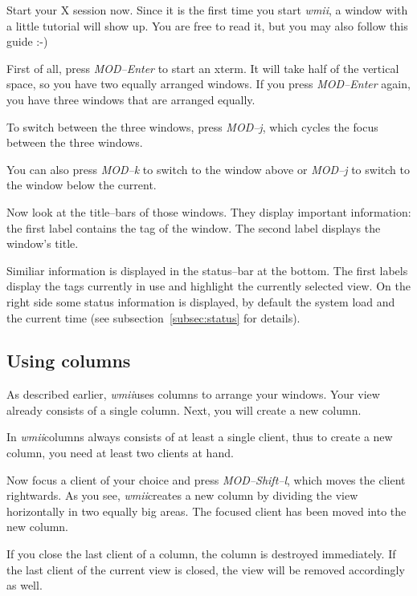 \documentclass[12pt,a4paper]{article} %
\newcommand{\wmii}{\emph{wmii}}
\begin{document}
    Start your X session now. Since it is the first time you
    start \wmii, a window with a little tutorial will show up. You are
    free to read it, but you may also follow this guide :-)

    First of all, press \emph{MOD--Enter} to start an xterm. It will
    take half of the vertical space, so you have two equally arranged
    windows. If you press \emph{MOD--Enter} again, you have three
    windows that are arranged equally.

    To switch between the three windows, press
    \emph{MOD--j}, which cycles the focus between the three windows.

    You can also press \emph{MOD--k} to switch to the window above or
    \emph{MOD--j} to switch to the window below the current.

    Now look at the title--bars of those windows. They display 
    important information: the first label contains the tag of
    the window. The second label displays the window's title.

    Similiar information is displayed in the status--bar at the bottom.  The
    first labels display the tags currently in use and highlight the currently
    selected view. On the right side some status information is displayed, by
    default the system load and the current time (see
    subsection~\ref{subsec:status} for details).

    \subsection{Using columns}

    As described earlier, \wmii uses columns to arrange your windows.
    Your view already consists of a single column.
    Next, you will create a new column.

    In \wmii columns always consists of at least a single client,
    thus to create a new column, you need at least two clients at hand.

    Now focus a client of your choice and press \emph{MOD--Shift--l},
    which moves the client rightwards. As you see, \wmii creates
    a new column by dividing the view horizontally in two equally big
    areas. The focused client has been moved into the new column.

    If you close the last client of a column, the column is destroyed
    immediately. If the last client of the current view is closed,
    the view will be removed accordingly as well.
\end{document}
